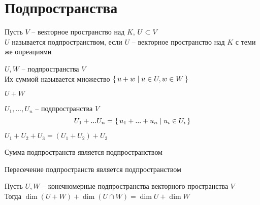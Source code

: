 \section{Подпространства}

\begin{definition}
	Пусть $V$ -- векторное пространство над $K$, $U \subset V $ \\
    $U$ называется подпространством, если $U$ -- векторное пространство над $K$ с теми же опреациями
\end{definition}

\begin{definition}
	$ U, W $ -- подпространства $V$ \\
    Их суммой называется множество $ \set{u + w | u \in U, w \in W} $
\end{definition}

\begin{notation}
	$ U + W $
\end{notation}

\begin{definition}
	$ U_1, ..., U_n $ -- подпространства $V$
    $$ U_1 + ... U_n = \set{u_1 + ... + u_n | u_i \in U_i} $$
\end{definition}

\begin{remark}
	$ U_1 + U_2 + U_3 = (U_1 + U_2) + U_3 $
\end{remark}

\begin{props}
	\item Сумма подпространств является подпространством
    \item Пересечение подпространств является подпространством
\end{props}

\begin{theorem}
	Пусть $ U, W $ -- конечномерные подпространства векторного пространства $V$ \\
    Тогда $ \dim (U + W) + \dim (U \cap W) = \dim U + \dim W $
\end{theorem}

